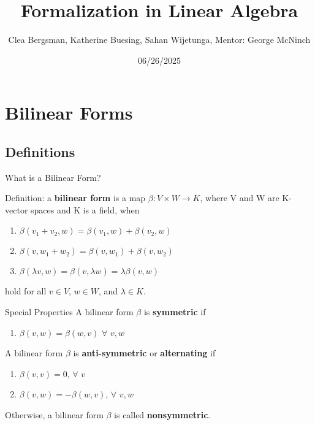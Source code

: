 \documentclass{beamer}
\title{Formalization in Linear Algebra}
\date{06/26/2025}
\author{Clea Bergsman, Katherine Buesing, 
Sahan Wijetunga, Mentor: George McNinch}
\institute[Formalization in Lean]{VERSEIM REU}
\begin{document}
	
	
	\begin{frame}
		\titlepage
	\end{frame}
	
	
	\begin{frame}
		\tableofcontents
	\end{frame}


\section{Bilinear Forms}
\subsection{Definitions}
\begin{frame} {What is a Bilinear Form?}
   
Definition: a \textbf {bilinear form} is a map $\beta : V\times W \to K $, where V and W are K-vector spaces and K is a field, when
\begin{enumerate}
    \item $\beta (v_1 + v_2 , w) = \beta (v_1 , w) +\beta ( v_2,w)$
    \item $\beta ( v, w_1 + w_2) = \beta (v,w_1) +\beta (v , w_2)$
    \item $\beta(\lambda v, w) = \beta (v, \lambda w) = \lambda \beta (v , w)$
\end{enumerate}
hold for all $v\in V$, $w\in W$, and $\lambda \in K$.
\end{frame}

\begin {frame} {Special Properties}
A bilinear form $\beta$ is \textbf{symmetric} if 
\begin{enumerate}
    \item $\beta (v,w) = \beta (w,v)$ $\forall$ $v,w$
\end{enumerate}
\vspace{1cm}
A bilinear form $\beta$ is \textbf{anti-symmetric} or \textbf{alternating} if
\begin{enumerate}
    \item $\beta (v,v) = 0$, $\forall$ $v$
    \item $\beta (v,w) = -\beta (w,v)$, $\forall$ $v,w$
\end{enumerate}
\vspace{1cm}
Otherwise, a bilinear form $\beta$ is called \textbf{nonsymmetric}.

\end{frame}
\end{document}
